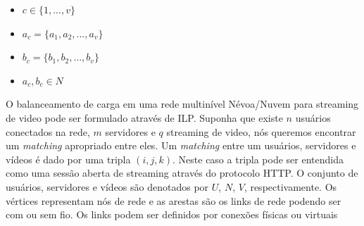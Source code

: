 \vspace{0.5cm}
\begin{itemize}

\item  $c \in \{1,...,v\}$

\item  $a_{c} = \{a_{1},a_{2},...,a_{v}\}$

\item  $b_{c} = \{b_{1},b_{2},...,b_{v}\}$

\item  $a_{c},b_{c} \in N$

\end{itemize}
\vspace{0.5cm}


O balanceamento de carga em uma rede multinível Névoa/Nuvem para streaming de video pode ser formulado através de ILP.
Suponha que existe $n$ usuários conectados na rede, $m$ servidores e $q$ streaming de video, nós queremos encontrar um \textit{matching} apropriado entre eles. Um \textit{matching} entre um usuários, servidores e vídeos é dado por uma tripla $(i,j,k)$. Neste caso a tripla pode ser entendida como uma sessão aberta de streaming através do protocolo HTTP. O conjunto de usuários, servidores e vídeos são denotados por $U$, $N$, $V$, respectivamente.
Os vértices representam nós de rede e as arestas são os links de rede podendo ser com ou sem fio. Os links podem ser definidos por conexões físicas ou virtuais






